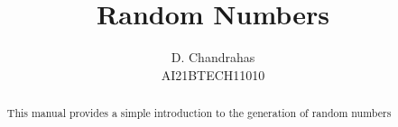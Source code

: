 \documentclass[journal,12pt,twocolumn]{IEEEtran}
\renewcommand\thesection{\arabic{section}}
\begin{document}
\let\StandardTheFigure\thefigure
\renewcommand{\thefigure}{\thesection}



\makeatletter
{}
\makeatother

\let\StandardTheFigure\thefigure
\let\StandardTheTable\thetable
\let\vec\mathbf
{}

\vspace{3cm}


\title{%
	Random Numbers
}

%
%
%

\author{D. Chandrahas\\AI21BTECH11010}
\maketitle

\tableofcontents

\bigskip

\renewcommand{\thefigure}{\theenumi}
\renewcommand{\thetable}{\theenumi}

\begin{abstract}
This manual provides a simple introduction to the generation of random numbers
\end{abstract}
\end{document}
